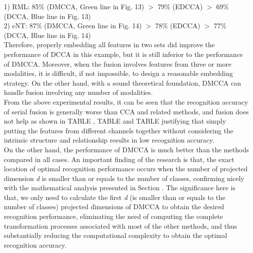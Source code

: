 \documentclass[journal]{IEEEtran}
\begin{document}
1) RML: 85\% (DMCCA, Green line in Fig. 13) $>$ 79\% (EDCCA) $>$ 69\% (DCCA, Blue line in Fig. 13)\\
2) eNT: 87\% (DMCCA, Green line in Fig. 14) $>$ 78\% (EDCCA) $>$ 77\% (DCCA, Blue line in Fig. 14)\\\indent
Therefore, properly embedding all features in two sets did improve the performance of DCCA in this example, but it is still inferior to the performance of DMCCA. Moreover, when the fusion involves features from three or more modalities, it is difficult, if not impossible, to design a reasonable embedding strategy. On the other hand, with a sound theoretical foundation, DMCCA can handle fusion involving any number of modalities.\\\indent From the above experimental results, it can be seen that the recognition accuracy of serial fusion is generally worse than CCA and related methods, and fusion does not help as shown in TABLE \uppercase\expandafter{}, TABLE \uppercase\expandafter{} and TABLE \uppercase\expandafter{} justifying that simply putting the features from different channels together without considering the intrinsic structure and relationship results in low recognition accuracy.\\\indent On the other hand, the performance of DMCCA is much better than the methods compared in all cases. An important finding of the research is that, the exact location of optimal recognition performance occurs when the number of projected dimension \emph{d} is smaller than or equals to the number of classes, confirming nicely with the mathematical analysis presented in Section \uppercase\expandafter{}. The significance here is that, we only need to calculate the first \emph{d} (is smaller than or equals to the number of classes) projected dimensions of DMCCA to obtain the desired recognition performance, eliminating the need of computing the complete transformation processes associated with most of the other methods, and thus substantially reducing the computational complexity to obtain the optimal recognition accuracy.
\end{document}
